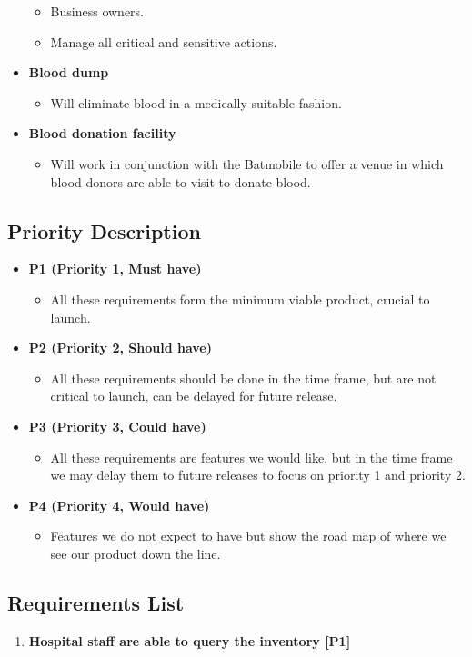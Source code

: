 \documentclass{article}
\begin{document}
\begin{itemize}
\begin{itemize}
            \item Business owners.
            \item Manage all critical and sensitive actions.
        \end{itemize}
    \item \textbf{Blood dump}
        \begin{itemize}
            \item Will eliminate blood in a medically suitable fashion.
        \end{itemize}
    \item \textbf{Blood donation facility}
        \begin{itemize}
            \item Will work in conjunction with the Batmobile to offer a venue in which blood donors  are able to visit to donate blood.
        \end{itemize}
\end{itemize}

\newpage
\subsection{Priority Description}
\begin{itemize}
    \item \textbf{P1 (Priority 1, Must have)}
        \begin{itemize}
            \item All these requirements form the minimum viable product, crucial to launch.
        \end{itemize}
    \item \textbf{P2 (Priority 2, Should have)}
        \begin{itemize}
            \item All these requirements should be done in the time frame, but are not critical to launch, can be delayed for future release.
        \end{itemize}
    \item \textbf{P3 (Priority 3, Could have)}
        \begin{itemize}
            \item All these requirements are features we would like, but in the time frame we may delay them to future releases to focus on priority 1 and priority 2.
        \end{itemize}
    \item \textbf{P4 (Priority 4, Would have)}
        \begin{itemize}
            \item Features we do not expect to have but show the road map of where we see our product down the line.
        \end{itemize}
\end{itemize}

\subsection{Requirements List}
\begin{enumerate}
    \item \textbf{Hospital staff are able to query the inventory [P1]}
\end{enumerate}
\end{document}
